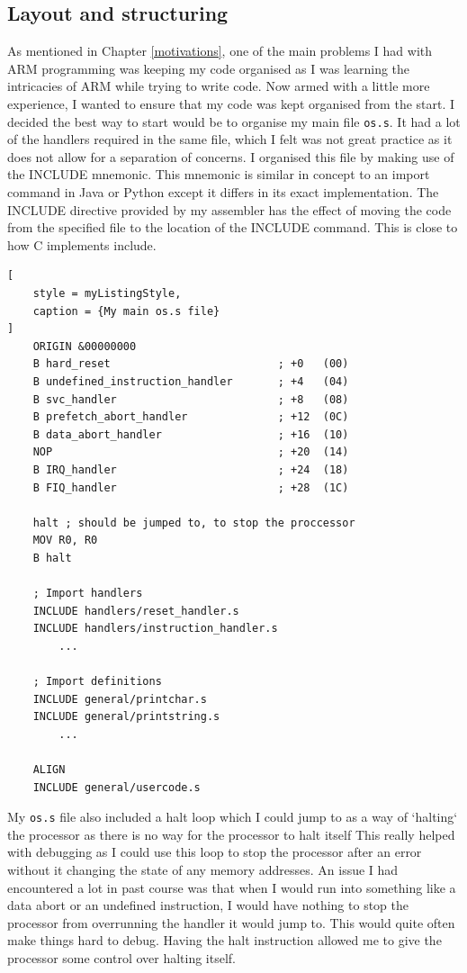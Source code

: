 \subsection{Layout and structuring}
As mentioned in Chapter \ref{motivations}, one of the main problems I had with ARM programming was keeping my code organised as I was learning the intricacies of ARM while trying to write code. Now armed with a little more experience, I wanted to ensure that my code was kept organised from the start. I decided the best way to start would be to organise my main file \verb|os.s|. It had a lot of the handlers required in the same file, which I felt was not great practice as it does not allow for a separation of concerns. I organised this file by making use of the INCLUDE mnemonic. This mnemonic is similar in concept to an import command in Java or Python except it differs in its exact implementation. The INCLUDE directive provided by my assembler has the effect of moving the code from the specified file to the location of the INCLUDE command. This is close to how C implements include. %

\begin{lstlisting}[
	style = myListingStyle,
	caption = {My main os.s file}
]
	ORIGIN &00000000
	B hard_reset                          ; +0   (00)
	B undefined_instruction_handler       ; +4   (04)
	B svc_handler                         ; +8   (08)
	B prefetch_abort_handler              ; +12  (0C)
	B data_abort_handler                  ; +16  (10)
	NOP                                   ; +20  (14)
	B IRQ_handler                         ; +24  (18)
	B FIQ_handler                         ; +28  (1C)

	halt ; should be jumped to, to stop the proccessor
	MOV R0, R0
	B halt

	; Import handlers
	INCLUDE handlers/reset_handler.s
	INCLUDE handlers/instruction_handler.s
 		...

	; Import definitions
	INCLUDE general/printchar.s
	INCLUDE general/printstring.s
  		...

	ALIGN
	INCLUDE general/usercode.s

\end{lstlisting}


My \verb|os.s| file also included a halt loop which I could jump to as a way of `halting` the processor as there is no way for the processor to halt itself
This really helped with debugging as I could use this loop to stop the processor after an error without it changing the state of any memory addresses. An issue I had encountered a lot in past course was that when I would run into something like a data abort or an undefined instruction, I would have nothing to stop the processor from overrunning the handler it would jump to. This would quite often make things hard to debug. Having the halt instruction allowed me to give the processor some control over halting itself.
